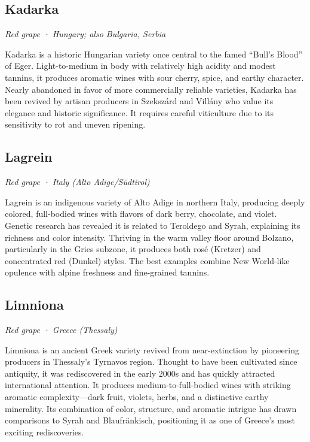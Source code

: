 \subsection*{Kadarka}
\textit{Red grape · Hungary; also Bulgaria, Serbia}\par\smallskip

Kadarka is a historic Hungarian variety once central to the famed “Bull’s Blood” of Eger. Light-to-medium in body with relatively high acidity and modest tannins, it produces aromatic wines with sour cherry, spice, and earthy character. Nearly abandoned in favor of more commercially reliable varieties, Kadarka has been revived by artisan producers in Szekszárd and Villány who value its elegance and historic significance. It requires careful viticulture due to its sensitivity to rot and uneven ripening.

\subsection*{Lagrein}
\textit{Red grape · Italy (Alto Adige/Südtirol)}\par\smallskip

Lagrein is an indigenous variety of Alto Adige in northern Italy, producing deeply colored, full-bodied wines with flavors of dark berry, chocolate, and violet. Genetic research has revealed it is related to Teroldego and Syrah, explaining its richness and color intensity. Thriving in the warm valley floor around Bolzano, particularly in the Gries subzone, it produces both rosé (Kretzer) and concentrated red (Dunkel) styles. The best examples combine New World-like opulence with alpine freshness and fine-grained tannins.

\subsection*{Limniona}
\textit{Red grape · Greece (Thessaly)}\par\smallskip

Limniona is an ancient Greek variety revived from near-extinction by pioneering producers in Thessaly’s Tyrnavos region. Thought to have been cultivated since antiquity, it was rediscovered in the early 2000s and has quickly attracted international attention. It produces medium-to-full-bodied wines with striking aromatic complexity—dark fruit, violets, herbs, and a distinctive earthy minerality. Its combination of color, structure, and aromatic intrigue has drawn comparisons to Syrah and Blaufränkisch, positioning it as one of Greece’s most exciting rediscoveries.

